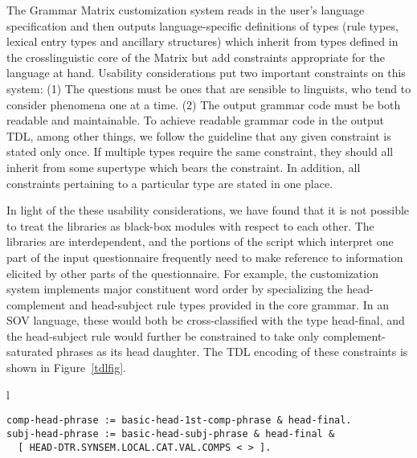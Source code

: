 \documentclass[11pt]{article}
\begin{document}
The Grammar Matrix customization system reads in the user's language
specification and then outputs language-specific definitions of types
(rule types, lexical entry types and ancillary structures) which
inherit from types defined in the crosslinguistic core of the Matrix
but add constraints appropriate for the language at hand. 
Usability considerations put two important constraints on this system:
(1) The questions must be ones that are sensible to linguists,
who tend to consider phenomena one at a time.  
(2) The output grammar code must be both readable and maintainable.
To achieve readable grammar code in the output TDL, among other
things, we follow the guideline that any given constraint is
stated only once.  If multiple types require the same constraint, they
should all inherit from some supertype which bears the constraint.
In addition, all constraints pertaining to a particular type are
stated in one place.

In light of the these usability considerations, we
have found that it is not possible to treat the libraries as black-box
modules with respect to each other.  The libraries are interdependent,
and the portions of the script which interpret one part of the input
questionnaire frequently need to make reference to information
elicited by other parts of the questionnaire.  For example, the
customization system implements major constituent word order by
specializing the head-complement and head-subject rule types provided
in the core grammar.  In an SOV language, these would both be
cross-classified with the type head-final, and the head-subject rule
would further be constrained to take only complement-saturated phrases
as its head daughter.  The TDL encoding of these constraints is shown
in Figure~\ref{tdlfig}.

\begin{figure*}[ht]
\small
\begin{center}
\begin{tabular}{l}
\begin{minipage}{5in}
\begin{verbatim}
comp-head-phrase := basic-head-1st-comp-phrase & head-final.
subj-head-phrase := basic-head-subj-phrase & head-final &
  [ HEAD-DTR.SYNSEM.LOCAL.CAT.VAL.COMPS < > ].
\end{verbatim}
\end{minipage}\\
\end{tabular}
\end{center}
\caption{Specialized phrase structure rule types for SOV language}
\label{tdlfig}
\end{figure*}
\end{document}
